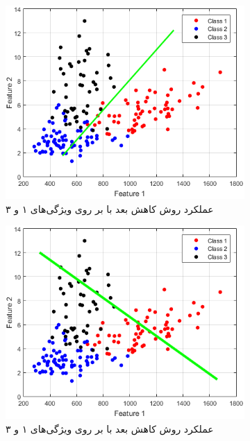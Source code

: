 \documentclass{article}
\begin{document}
\begin{figure}[h]
    \begin{subfigure}{0.3\linewidth}
        \centering
        \includegraphics[scale=0.15]{images/q2/pca13.png}
        \caption{عملکرد روش کاهش بعد  با بر روی ویژگی‌های ۱ و ۳}
    \end{subfigure}
    \newline
    \begin{subfigure}{0.3\linewidth}
        \centering
        \includegraphics[scale=0.15]{images/q2/fisher13.png}
        \caption{عملکرد روش کاهش بعد  با بر روی ویژگی‌های ۱ و ۳}
    \end{subfigure}
    \hfill
    \begin{subfigure}{0.3\linewidth}

\end{subfigure}
\end{figure}
\end{document}

